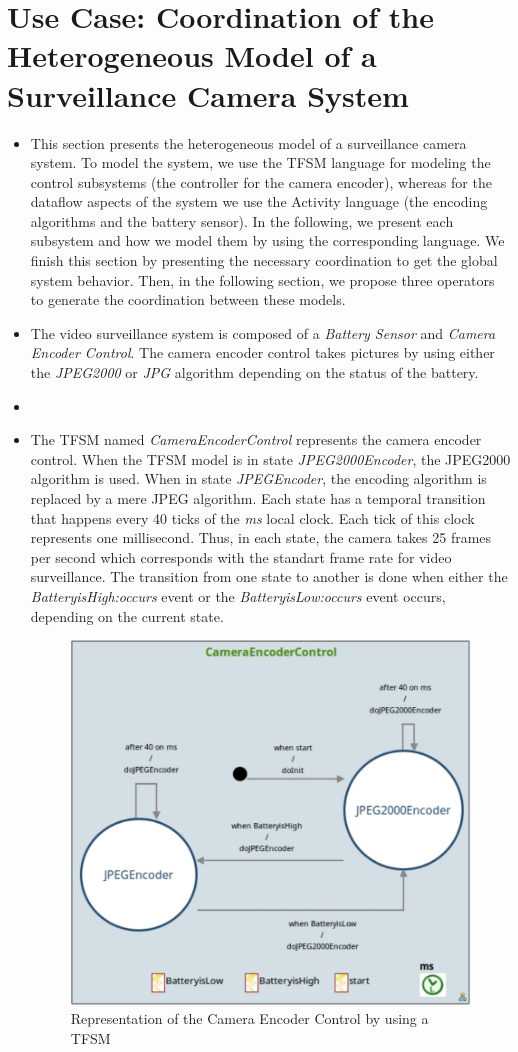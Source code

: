 \section{Use Case: Coordination of the Heterogeneous Model of a Surveillance Camera System}
\begin{itemize}
	\item This section presents the heterogeneous model of a surveillance camera system. To model the system, we use the TFSM language for modeling the control subsystems (\ie the controller for the camera encoder), whereas for the dataflow aspects of the system we use the Activity language (\ie the encoding algorithms and the battery sensor). In the following, we present each subsystem and how we model them by using the corresponding language. We finish this section by presenting the necessary coordination to get the global system behavior. Then, in the following section, we propose three operators to generate the coordination between these models. 
	
	\item The video surveillance system is composed of a \emph{Battery Sensor} and \emph{Camera Encoder Control}. The camera encoder control takes pictures by using either the \emph{JPEG2000} or \emph{JPG} algorithm depending on the status of the battery. 
	
	\item {}
	
	\item The TFSM named \emph{CameraEncoderControl} represents the camera encoder control. When the TFSM model is in state \emph{JPEG2000Encoder}, the JPEG2000 algorithm is used. When in state \emph{JPEGEncoder}, the encoding algorithm is replaced by a mere JPEG algorithm. Each state has a temporal transition that happens every 40 ticks of the \emph{ms} local clock. Each tick of this clock represents one millisecond. Thus, in each state, the camera takes 25 frames per second which corresponds with the standart frame rate for video surveillance. The transition from one state to another is done when either the \emph{BatteryisHigh:occurs} event or the \emph{BatteryisLow:occurs} event occurs, depending on the current state.	
	
		\begin{figure}[h]
			\center
			\includegraphics[width=.6\columnwidth]{examples/figs/cameraencodercontrol.pdf}
			\caption{Representation of the Camera Encoder Control by using a TFSM}
			\label{fig:cameramodelencoder}
		\end{figure}
	

\end{itemize}
